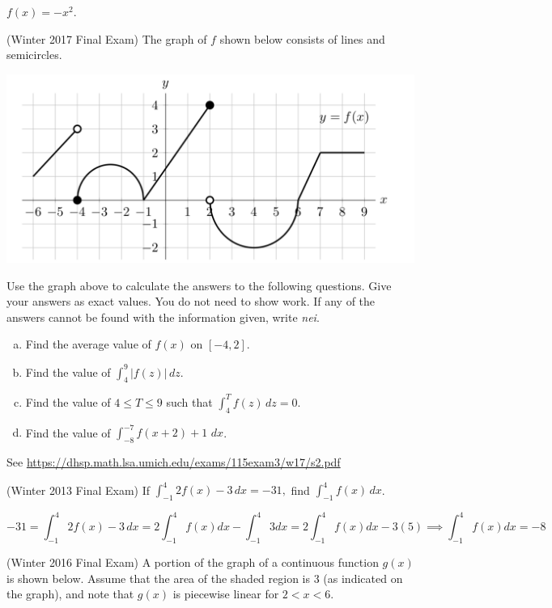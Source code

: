 \documentclass[11pt]{exam}
\begin{document}
\begin{questions}
\begin{solution}
  \(f(x) = -x^2\). 
\end{solution}
\question (Winter 2017 Final Exam) %
The graph of $f$ shown below consists of lines and semicircles.	
\begin{center}
  \includegraphics[scale=0.5]{Figures/graph1}
\end{center}
Use the graph above to calculate the answers to the following questions. Give your answers as exact values. You do not need to show work. If any of the answers cannot be found with the information given, write \emph{nei}.
\begin{enumerate}[(a)]
	\item Find the average value of $f(x)$ on $[-4,2]$.
	\item Find the value of $\displaystyle\int_{4}^9 |f(z)| \, dz$.
	\item Find the value of $4 \leqslant T \leqslant 9$ such that $\displaystyle\int_{4}^T f(z) \, dz = 0$.
	\item Find the value of $\displaystyle\int_{-8}^{-7} f(x+2)+1 \,\, dx$.
\end{enumerate}
\begin{solution}
  See \href{https://dhsp.math.lsa.umich.edu/exams/115exam3/w17/s2.pdf}{https://dhsp.math.lsa.umich.edu/exams/115exam3/w17/s2.pdf}
\end{solution}
\question (Winter 2013 Final Exam) %
	If $\displaystyle\int_{-1}^4 2 f(x) - 3 \, dx = -31,$ find $\displaystyle\int_{-1}^4 f(x)  \, dx$.
        \begin{solution}
          \[
            -31 = \int_{-1}^4 2 f(x) - 3 \, dx = 2\int_{-1}^4 f(x) dx -
            \int_{-1}^4 3 dx = 2 \int_{-1}^4 f(x) dx - 3(5) \implies
            \int_{-1}^4 f(x) dx = -8
          \]
        \end{solution}
\pagebreak
\question (Winter 2016 Final Exam)
A portion of the graph of a continuous function $g(x)$ is shown below. Assume that the area of the shaded region is 3 (as indicated on the graph), and note that $g(x)$ is piecewise linear for $2 < x < 6$.

\end{questions}
\end{document}
